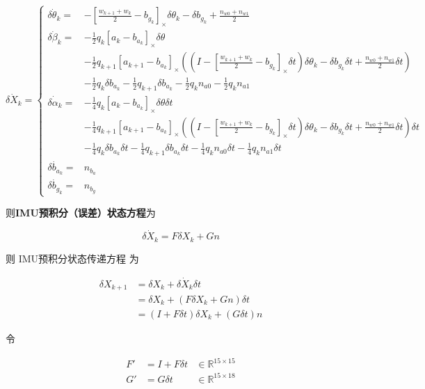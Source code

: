 \documentclass[12pt,a4paper]{article}
\begin{document}
\begin{equation}
\dot{\delta X_k} =
\begin{cases}
\dot{\delta \theta_{k}} =&
-[\frac{w_{k+1}+w_{k}}{2}-b_{g_{k}}]_{\times} \delta \theta_{k}-\delta b_{g_{k}}+\frac{n_{w0}+n_{w1}}{2} \\
\dot{\delta\beta_{k}} =&
-\frac{1}{2}q_{k}[a_{k}-b_{a_{k}}]_{\times}\delta \theta \\
&-\frac{1}{2}q_{k+1}[a_{k+1}-b_{a_{k}}]_{\times}((I-[\frac{w_{k+1}+w_{k}}{2}-b_{g_{k}}]_{\times }\delta t) \delta \theta_{k} -\delta b_{g_{k}}\delta t+\frac{n_{w0}+n_{w1}}{2}\delta t) \\
&-\frac{1}{2}q_{k}\delta b_{a_{k}}-\frac{1}{2}q_{k+1}\delta b_{a_{k}}-\frac{1}{2}q_{k}n_{a0}-\frac{1}{2}q_{k}n_{a1} \\
\dot{\delta\alpha_{k}} =&
-\frac{1}{4}q_{k}[a_{k}-b_{a_{k}}]_{\times}\delta \theta\delta t \\
&-\frac{1}{4}q_{k+1}[a_{k+1}-b_{a_{k}}]_{\times}((I-[\frac{w_{k+1}+w_{k}}{2}-b_{g_{k}}]_{\times }\delta t) \delta \theta _{k} -\delta b_{g_{k}}\delta t+\frac{n_{w0}+n_{w1}}{2}\delta t)\delta t \\
&-\frac{1}{4}q_{k}\delta b_{a_{k}}\delta t-\frac{1}{4}q_{k+1}\delta b_{a_{k}}\delta t-\frac{1}{4}q_{k}n_{a0}\delta t-\frac{1}{4}q_{k}n_{a1}\delta t \\
\dot{\delta b_{a_k}} =&  n_{b_a} \\
\dot{\delta b_{g_k}} =&  n_{b_g}
\end{cases}
\end{equation}

则\textbf{IMU预积分（误差）状态方程}为

\begin{equation}
\dot{\delta X_k} = F \delta X_k + Gn
\end{equation}

则 IMU预积分状态传递方程 为

\begin{equation}
\label{equ:preinte_iter_time}
\begin{aligned}
\delta X_{k+1}
&= \delta X_k + \dot{\delta X_k} \delta t \\
&= \delta X_k + (F \delta X_k + Gn) \delta t \\
&= (I + F \delta t) \delta X_k + (G \delta t) n
\end{aligned}
\end{equation}

令

\begin{equation}
\label{equ:F1_G1}
\begin{aligned}
F' &= I + F \delta t &\in \mathbb{R}^{15 \times 15} \\
G' &= G \delta t     &\in \mathbb{R}^{15 \times 18}
\end{aligned}
\end{equation}
\end{document}
